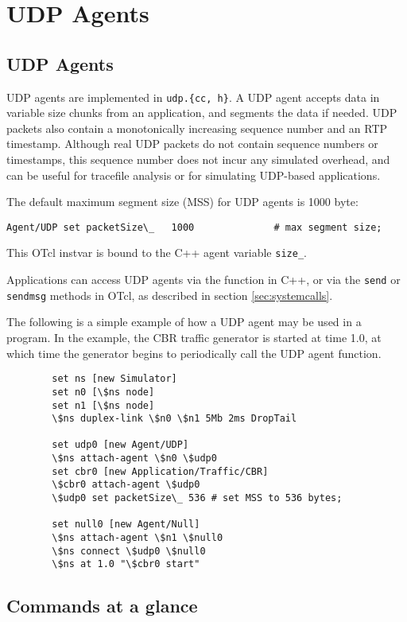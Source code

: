 \chapter{UDP Agents}
\label{sec:udpAgents}

\section{UDP Agents}
\label{sec:udpagent}
UDP agents are implemented in {\tt udp.\{cc, h\}}.  A UDP agent accepts
data in variable size chunks from an application, and segments the data 
if needed.  UDP packets also contain a monotonically increasing sequence
number and an RTP timestamp.  Although real UDP packets do not contain 
sequence numbers or timestamps, this sequence number does not incur any 
simulated overhead, and can be useful for tracefile analysis or for
simulating UDP-based applications.

The default maximum segment size (MSS) for UDP agents is 1000 byte:
\begin{verbatim}
Agent/UDP set packetSize\_   1000              # max segment size;
\end{verbatim}
This OTcl instvar is bound to the C++ agent variable {\tt size\_}.  

Applications can access UDP agents via the  function in C++,
or via the {\tt send} or {\tt sendmsg} methods in OTcl, as described in
section \ref{sec:systemcalls}.  

The following is a simple example of how a UDP agent may be used in a program.  
In the example, the CBR traffic generator is started at time 1.0, at which time
the generator begins to periodically call the UDP agent 
function.
\begin{verbatim}
        set ns [new Simulator]
        set n0 [\$ns node]
        set n1 [\$ns node]
        \$ns duplex-link \$n0 \$n1 5Mb 2ms DropTail

        set udp0 [new Agent/UDP]
        \$ns attach-agent \$n0 \$udp0
        set cbr0 [new Application/Traffic/CBR]
        \$cbr0 attach-agent \$udp0
        \$udp0 set packetSize\_ 536	# set MSS to 536 bytes;

        set null0 [new Agent/Null]
        \$ns attach-agent \$n1 \$null0
        \$ns connect \$udp0 \$null0
        \$ns at 1.0 "\$cbr0 start"
\end{verbatim}

\section{Commands at a glance}
\label{sec:udpcommand}

